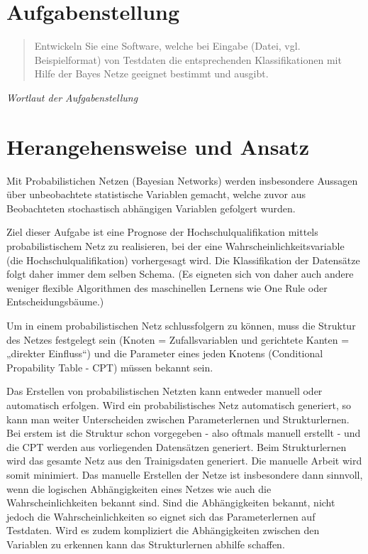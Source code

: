 \newpage
\section{Aufgabenstellung}
\begin{quote}
\glqq Entwickeln Sie eine Software, welche bei Eingabe (Datei, vgl. Beispielformat) von Testdaten die entsprechenden Klassifikationen mit Hilfe der Bayes Netze geeignet bestimmt und ausgibt.\grqq
\end{quote}
\textit{Wortlaut der Aufgabenstellung}
\section{Herangehensweise und Ansatz}
Mit Probabilistichen Netzen (Bayesian Networks) werden insbesondere Aussagen über unbeobachtete statistische Variablen gemacht, welche zuvor aus Beobachteten stochastisch abhängigen Variablen gefolgert wurden.

Ziel dieser Aufgabe ist eine Prognose der Hochschulqualifikation mittels probabilistischem Netz zu realisieren, bei der eine Wahrscheinlichkeitsvariable (die Hochschulqualifikation) vorhergesagt wird. Die Klassifikation der Datensätze folgt daher immer dem selben Schema. (Es eigneten sich von daher auch andere weniger flexible Algorithmen des maschinellen Lernens wie One Rule oder Entscheidungsbäume.)

Um in einem probabilistischen Netz schlussfolgern zu können, muss die Struktur des Netzes festgelegt sein (Knoten = Zufallsvariablen und gerichtete Kanten = „direkter Einfluss“) und die Parameter eines jeden Knotens (Conditional Propability Table - CPT) müssen bekannt sein. 

Das Erstellen von probabilistischen Netzten kann entweder manuell oder automatisch erfolgen. Wird ein probabilistisches Netz automatisch generiert, so kann man weiter Unterscheiden zwischen Parameterlernen und Strukturlernen. Bei erstem ist die Struktur schon vorgegeben - also oftmals manuell erstellt - und die CPT werden aus vorliegenden Datensätzen generiert. 
Beim Strukturlernen wird das gesamte Netz aus den Trainigsdaten generiert. Die manuelle Arbeit wird somit minimiert. Das manuelle Erstellen der Netze ist insbesondere dann sinnvoll, wenn die logischen Abhängigkeiten eines Netzes wie auch die Wahrscheinlichkeiten bekannt sind. Sind die Abhängigkeiten bekannt, nicht jedoch die Wahrscheinlichkeiten so eignet sich das Parameterlernen auf Testdaten. Wird es zudem kompliziert die Abhängigkeiten zwischen den Variablen zu erkennen kann das Strukturlernen abhilfe schaffen.
\clearpage
